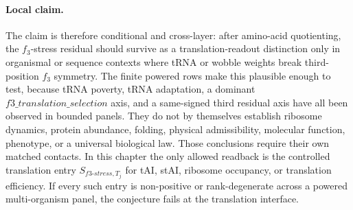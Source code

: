 \paragraph{Local claim.}
The claim is therefore conditional and cross-layer: after amino-acid quotienting, the $f_3$-stress residual should survive as a translation-readout distinction only in organismal or sequence contexts where tRNA or wobble weights break third-position $f_3$ symmetry.  The finite powered rows make this plausible enough to test, because tRNA poverty, tRNA adaptation, a dominant $f3\_translation\_selection$ axis, and a same-signed third residual axis have all been observed in bounded panels.  They do not by themselves establish ribosome dynamics, protein abundance, folding, physical admissibility, molecular function, phenotype, or a universal biological law.  Those conclusions require their own matched contacts.  In this chapter the only allowed readback is the controlled translation entry $S_{f3\text{-}stress,T_j}$ for tAI, stAI, ribosome occupancy, or translation efficiency.  If every such entry is non-positive or rank-degenerate across a powered multi-organism panel, the conjecture fails at the translation interface.
